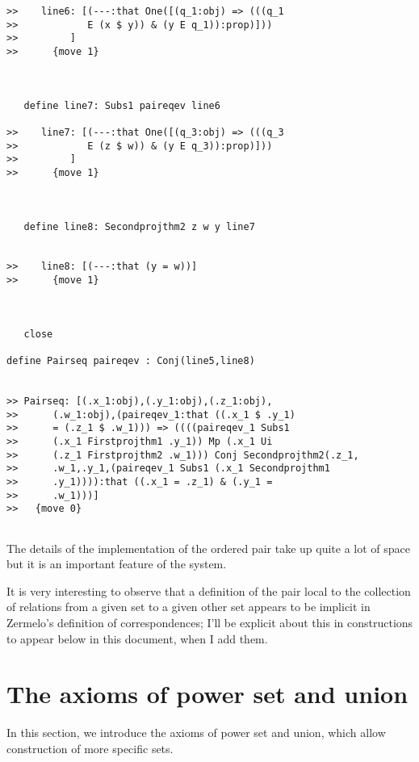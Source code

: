 \documentclass[12pt]{article}
\begin{document}
\begin{verbatim}
>>    line6: [(---:that One([(q_1:obj) => (((q_1
>>            E (x $ y)) & (y E q_1)):prop)]))
>>         ]
>>      {move 1}



   define line7: Subs1 paireqev line6

>>    line7: [(---:that One([(q_3:obj) => (((q_3
>>            E (z $ w)) & (y E q_3)):prop)]))
>>         ]
>>      {move 1}



   define line8: Secondprojthm2 z w y line7


>>    line8: [(---:that (y = w))]
>>      {move 1}



   close

define Pairseq paireqev : Conj(line5,line8)


>> Pairseq: [(.x_1:obj),(.y_1:obj),(.z_1:obj),
>>      (.w_1:obj),(paireqev_1:that ((.x_1 $ .y_1)
>>      = (.z_1 $ .w_1))) => ((((paireqev_1 Subs1
>>      (.x_1 Firstprojthm1 .y_1)) Mp (.x_1 Ui
>>      (.z_1 Firstprojthm2 .w_1))) Conj Secondprojthm2(.z_1,
>>      .w_1,.y_1,(paireqev_1 Subs1 (.x_1 Secondprojthm1
>>      .y_1)))):that ((.x_1 = .z_1) & (.y_1 =
>>      .w_1)))]
>>   {move 0}


\end{verbatim}

The details of the implementation of the ordered pair take up quite a lot of space but it is an important feature of the system.

It is very interesting to observe that a definition of the pair local to the collection of relations from a given set to a given other set appears to be implicit in Zermelo's definition of correspondences;  I'll be explicit about this in constructions to appear below in this document, when I add them.

\section{The axioms of power set and union}

In this section, we introduce the axioms of power set and union, which allow construction of more specific sets.
\end{document}
